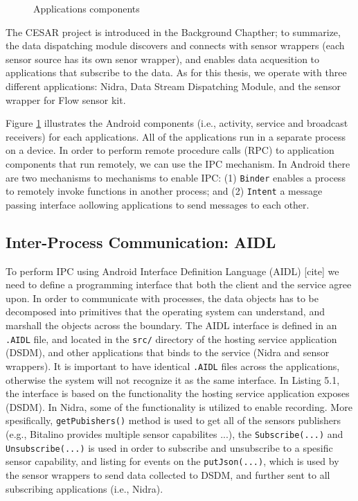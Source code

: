 \begin{figure}
    \caption{Applications components}
    \label{fig:app_components}
\end{figure}

The CESAR project is introduced in the Background Chapther; to summarize, the data dispatching module discovers and connects with sensor wrappers (each sensor source has its own senor wrapper), and enables data acquesition to applications that subscribe to the data. As for this thesis, we operate with three different applications: Nidra, Data Stream Dispatching Module, and the sensor wrapper for Flow sensor kit. 

Figure \ref{fig:app_components} illustrates the Android components (i.e., activity, service and broadcast receivers) for each applications. All of the applications run in a separate process on a device. In order to perform remote procedure calls (RPC) to application components that run remotely, we can use the IPC mechanism. In Android there are two mechanisms to mechanisms to enable IPC: (1) \verb|Binder| enables a process to remotely invoke functions in another process; and (2) \verb|Intent| a message passing interface aollowing applications to send messages to each other.




\subsection{Inter-Process Communication: AIDL}
To perform IPC using Android Interface Definition Language (AIDL) [cite] we need to define a programming interface that both the client and the service agree upon. In order to communicate with processes, the data objects has to be decomposed into primitives that the operating system can understand, and marshall the objects across the boundary. The AIDL interface is defined in an \verb|.AIDL| file, and located in the \verb|src/| directory of the hosting service application (DSDM), and other applications that binds to the service (Nidra and sensor wrappers). It is important to have identical \verb|.AIDL| files across the applications, otherwise the system will not recognize it as the same interface. In Listing 5.1, the interface is based on the functionality the hosting service application exposes (DSDM). In Nidra, some of the functionality is utilized to enable recording. More spesifically, \verb|getPubishers()| method is used to get all of the sensors publishers (e.g., Bitalino provides multiple sensor capabilites ...), the \verb|Subscribe(...)| and \verb|Unsubscribe(...)| is used in order to subscribe and unsubscribe to a spesific sensor capability, and listing for events on the \verb|putJson(...)|, which is used by the sensor wrappers to send data collected to DSDM, and further sent to all subscribing applications (i.e., Nidra). 


